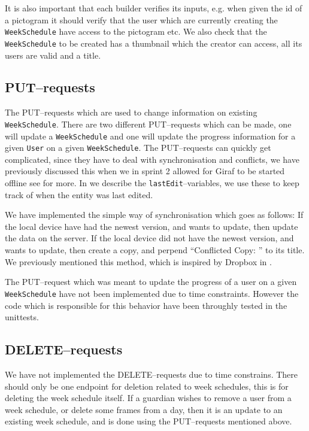 It is also important that each builder verifies its inputs, e.g. when given the id of a pictogram it should verify that the user which are currently creating the \texttt{WeekSchedule} have access to the pictogram etc.
We also check that the \texttt{WeekSchedule} to be created has a thumbnail which the creator can access, all its users are valid and a title.

\subsection{PUT--requests}
The PUT--requests which are used to change information on existing \texttt{WeekSchedule}.
There are two different PUT--requests which can be made, one will update a \texttt{WeekSchedule} and one will update the progress information for a given \texttt{User} on a given \texttt{WeekSchedule}.
The PUT--requests can quickly get complicated, since they have to deal with synchronisation and conflicts, we have previously discussed this when we in sprint 2 allowed for Giraf to be started offline see  for more.
In  we describe the \texttt{lastEdit}--variables, we use these to keep track of when the entity was last edited.

We have implemented the simple way of synchronisation which goes as follows:
If the local device have had the newest version, and wants to update, then update the data on the server.
If the local device did not have the newest version, and wants to update, then create a copy, and perpend ``Conflicted Copy: '' to its title.
We previously mentioned this method, which is inspired by Dropbox in .

The PUT--request which was meant to update the progress of a user on a given \texttt{WeekSchedule} have not been implemented due to time constraints.
However the code which is responsible for this behavior have been throughly tested in the unittests.

\subsection{DELETE--requests}
We have not implemented the DELETE--requests due to time constrains.
There should only be one endpoint for deletion related to week schedules, this is for deleting the week schedule itself.
If a guardian wishes to remove a user from a week schedule, or delete some frames from a day, then it is an update to an existing week schedule, and is done using the PUT--requests mentioned above.